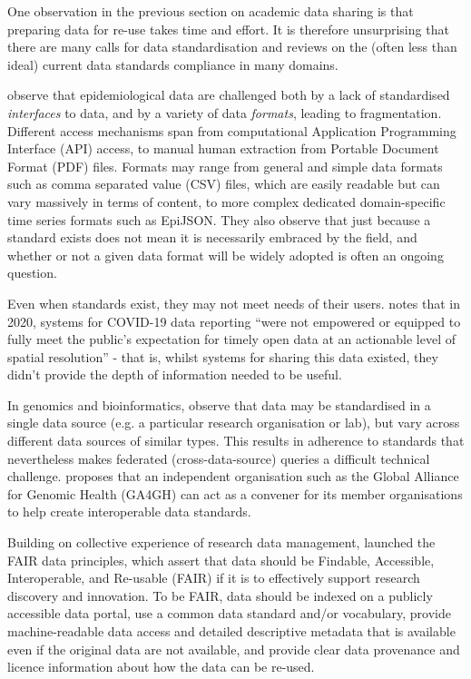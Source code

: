 \documentclass{CUP-JNL-DAP}%
\begin{document}
One observation in the previous section on academic data sharing is that preparing data for re-use takes time and effort. It is therefore unsurprising that there are many calls for data standardisation and reviews on the (often less than ideal) current data standards compliance in many domains.  

\cite{fairchild_epidemiological_2018} observe that epidemiological data are challenged both by a lack of standardised \textit{interfaces} to data, and by a variety of data \textit{formats}, leading to fragmentation. Different access mechanisms span from computational Application Programming Interface (API) access, to manual human extraction from Portable Document Format (PDF) files. Formats may range from general and simple data formats such as comma separated value (CSV) files, which are easily readable but can vary massively in terms of content, to more complex dedicated domain-specific time series formats such as EpiJSON. They also observe that just because a standard exists does not mean it is necessarily embraced by the field, and whether or not a given data format will be widely adopted is often an ongoing question. 

Even when standards exist, they may not meet needs of their users. \cite{gardner_need_2021} notes that in 2020, systems for COVID-19 data reporting \enquote{were not empowered or equipped to fully meet the public's expectation for timely open data at an actionable level of spatial resolution} - that is, whilst systems for sharing this data existed, they didn't provide the depth of information needed to be useful. 

In genomics and bioinformatics, \cite{thorogood_international_2021} observe that data may be standardised in a single data source (e.g. a particular research organisation or lab), but vary across different data sources of similar types. This results in adherence to standards that nevertheless makes federated (cross-data-source) queries a difficult technical challenge. \cite{thorogood_international_2021} proposes that an independent organisation such as the Global Alliance for Genomic Health (GA4GH) can act as a convener for its member organisations to help create interoperable data standards. 

Building on collective experience of research data management, \cite{wilkinson_fair_2016} launched the FAIR data principles, which assert that data should be Findable, Accessible, Interoperable, and Re-usable (FAIR) if it is to effectively support research discovery and innovation. To be FAIR, data should be indexed on a publicly accessible data portal, use a common data standard and/or vocabulary, provide machine-readable data access and detailed descriptive metadata that is available even if the original data are not available, and provide clear data provenance and licence information about how the data can be re-used. 
\end{document}
